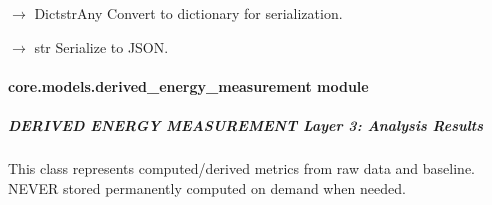\documentclass[letterpaper,10pt,english]{sphinxmanual}
\begin{document}
\begin{fulllineitems}
\begin{fulllineitems}
\label{\detokenize{core.models.baseline_measurement:core.models.baseline_measurement.BaselineMeasurement.to_dict}}
\pysigstartsignatures
\pysiglinewithargsret
{}
{}
{{ $\rightarrow$ Dict\DUrole{p}{{[}}strAny\DUrole{p}{{]}}}}
\pysigstopsignatures
\sphinxAtStartPar
Convert to dictionary for serialization.

\end{fulllineitems}


\begin{fulllineitems}
\label{\detokenize{core.models.baseline_measurement:core.models.baseline_measurement.BaselineMeasurement.to_json}}
\pysigstartsignatures
\pysiglinewithargsret
{}
{}
{{ $\rightarrow$ str}}
\pysigstopsignatures
\sphinxAtStartPar
Serialize to JSON.

\end{fulllineitems}


\end{fulllineitems}


\sphinxstepscope


\paragraph{core.models.derived\_energy\_measurement module}
\label{\detokenize{core.models.derived_energy_measurement:module-core.models.derived_energy_measurement}}\label{\detokenize{core.models.derived_energy_measurement:core-models-derived-energy-measurement-module}}\label{\detokenize{core.models.derived_energy_measurement::doc}}

\subparagraph{DERIVED ENERGY MEASUREMENT \textendash{} Layer 3: Analysis Results}
\label{\detokenize{core.models.derived_energy_measurement:derived-energy-measurement-layer-3-analysis-results}}
\sphinxAtStartPar
This class represents computed/derived metrics from raw data and baseline.
NEVER stored permanently \textendash{} computed on demand when needed.
\end{document}
